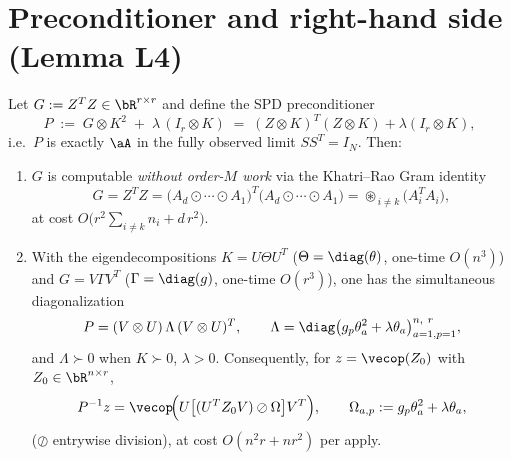 \section*{Preconditioner and right-hand side (Lemma L4)}

\begin{lemma}\label{lem:precond}
Let $G:=Z^{T}Z\in\bR^{r\times r}$ and define the SPD preconditioner
\begin{equation}\label{eq:Pdef}
  P \;:=\; G\otimes K^{2}\;+\;\lambda\,(I_r\otimes K)
  \;=\;(Z\otimes K)^{T}(Z\otimes K)+\lambda(I_r\otimes K),
\end{equation}
i.e.\ $P$ is exactly $\aA$ in the fully observed limit $SS^{T}=I_N$. Then:
\begin{enumerate}[label=\textup{(\roman*)}]
\item $G$ is computable \emph{without order-$M$ work} via the Khatri--Rao
      Gram identity
      \begin{equation}\label{eq:krgram}
        G=Z^{T}Z=\big(A_{d}\odot\!\cdots\!\odot A_{1}\big)^{T}\!\big(A_{d}\odot\!\cdots\!\odot A_{1}\big)
        =\!\!\!\circledast_{\,i\neq k}\!\!\big(A_i^{T}A_i\big),
      \end{equation}
      at cost $O\!\big(r^{2}\sum_{i\neq k} n_i + d\,r^{2}\big)$.
\item With the eigendecompositions $K=U\Theta U^{T}$ ($\Theta=\diag(\theta)$,
      one-time $O(n^{3})$) and $G=V\Gamma V^{T}$ ($\Gamma=\diag(g)$, one-time
      $O(r^{3})$), one has the simultaneous diagonalization
      \begin{equation}\label{eq:Peig}
        P=(V\otimes U)\,\Lambda\,(V\otimes U)^{T},\qquad
        \Lambda=\diag\big(g_p\theta_a^{2}+\lambda\theta_a\big)_{a=1,p=1}^{n,\ r},
      \end{equation}
      and $\Lambda\succ0$ when $K\succ0$, $\lambda>0$. Consequently, for
      $z=\vecop(Z_0)$ with $Z_0\in\bR^{n\times r}$,
      \begin{equation}\label{eq:Pinv}
        P^{-1}z=\vecop\!\Big(U\big[(U^{T}Z_0V)\oslash \Omega\big]V^{T}\Big),
        \qquad \Omega_{a,p}:=g_p\theta_a^{2}+\lambda\theta_a,
      \end{equation}
      ($\oslash$ entrywise division), at cost $O(n^{2}r+nr^{2})$ per apply.
\end{enumerate}
\end{lemma}

